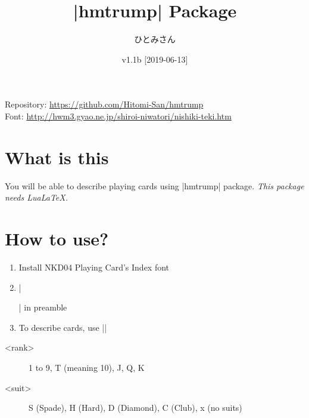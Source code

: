 \documentclass{jlreq}
\title{|hmtrump| Package}
\author{ひとみさん}
\date{v1.1b [2019-06-13]}
\begin{document}
\maketitle

\begin{center}
Repository: \url{https://github.com/Hitomi-San/hmtrump}\\
Font: \url{http://hwm3.gyao.ne.jp/shiroi-niwatori/nishiki-teki.htm}
\end{center}

\hrulefill
\tableofcontents
\pagebreak

\section{What is this}
You will be able to describe playing cards using |hmtrump| package.
\emph{This package needs LuaLaTeX.}


\section{How to use?}
\begin{enumerate}
\item Install NKD04 Playing Card's Index font
\item |\usepackage{hmtrump}| in preamble
\item To describe cards, use ||
\end{enumerate}

\begin{description}
\item[<rank>] 1 to 9, T (meaning 10), J, Q, K
\item[<suit>] S (Spade), H (Hard), D (Diamond), C (Club), x (no suits)
\end{description}
\end{document}
